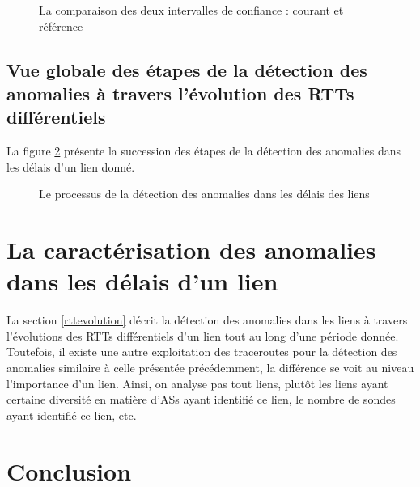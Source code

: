 \begin{figure}[h]
	\centering
	\captionsetup{justification=centering}
	\resizebox{\textwidth}{!}{
		
	}
	\caption{La comparaison des deux intervalles de confiance : courant et référence }
	\label{fig:intervals-comparaison}
\end{figure}

\subsection{Vue globale des étapes de la détection des anomalies à travers l'évolution des RTTs différentiels}
La figure 	\ref{fig:process-rttanalysis_tex} présente la succession des étapes de la détection des anomalies dans les délais d'un lien donné. 

\begin{figure}[h]
	\centering
	\resizebox{\textwidth}{\textheight}{
		
	}
	\caption{Le processus de la détection des anomalies dans les délais des liens}
	\label{fig:process-rttanalysis_tex}
\end{figure}



\section{La caractérisation des anomalies dans les délais d'un lien}
La section \ref{rttevolution} décrit la détection des anomalies dans les liens à travers l'évolutions des RTTs différentiels d'un lien tout au long d'une période donnée. Toutefois, il existe une autre exploitation des traceroutes pour la détection des anomalies similaire à celle présentée précédemment, la différence se voit au niveau l'importance d'un lien. Ainsi, on analyse pas tout liens, plutôt les liens ayant certaine diversité en matière d'ASs ayant identifié ce lien, le nombre de sondes ayant identifié ce lien, etc. 

\section{Conclusion}